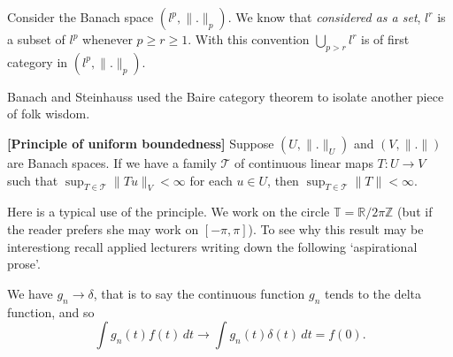\begin{exercise} Consider the Banach space $(l^{p},\|.\|_{p})$.
We know that \emph{considered as a set}, $l^{r}$ is a subset
of $l^{p}$ whenever $p\geq r\geq 1$. With this convention
$\bigcup_{p>r}l^{r}$ is of first category in $(l^{p},\|.\|_{p})$.
\end{exercise}
Banach and Steinhauss used the Baire category theorem to isolate
another piece of folk wisdom.
\begin{theorem}{\bf[Principle of uniform boundedness]}
Suppose $(U,\|.\|_{U})$
and $(V,\|.\|)$ are Banach spaces. If we have a family
${\mathcal T}$ of continuous linear maps $T:U\rightarrow V$
such that $\sup_{T\in{\mathcal T}}\|Tu\|_{V}<\infty$
for each $u\in U$, then  $\sup_{T\in{\mathcal T}}\|T\|<\infty$.
\end{theorem}
Here is a typical use of the principle. We work
on the circle ${\mathbb T}={\mathbb R}/{2\pi\mathbb Z}$
(but if the reader prefers she may work on $[-\pi,\pi]$).
To see why this result may be interestiong recall
applied lecturers writing down the following
`aspirational prose'.

\begin{small}\begin{sf}
We have $g_{n}\rightarrow \delta$, that is to say
the  continuous function $g_{n}$ tends to the delta function,
and so
\[\int g_{n}(t)f(t)\,dt\rightarrow\int g_{n}(t)\delta(t)\,dt=f(0).\]
\end{sf}\end{small}

